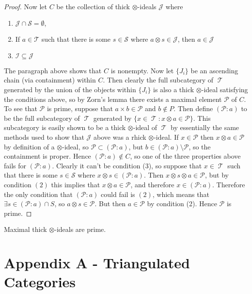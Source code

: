 \documentclass[11pt]{article}
\DeclareMathOperator{\TT}{\mathcal{T}}
\begin{document}
\begin{proof}
Now let $C$ be the collection of thick $\otimes$-ideals $\mathcal{J}$ where 
\begin{enumerate}[(1)]
	\item $\mathcal{J} \cap \mathcal{S} = \emptyset$,
	\item If $a \in \mathcal{T}$ such that there is some $s \in \mathcal{S}$ where $a \otimes s \in \mathcal{J}$, then $a \in \mathcal{J}$
	\item $\mathcal{I} \subseteq \mathcal{J}$
\end{enumerate}
The paragraph above shows that $C$ is nonempty. Now let $\{J_i\}$ be an ascending chain (via containment) within $C$. Then clearly the full subcategory of $\TT$ generated by the union of the objects within $\{J_i\}$ is also a thick $\otimes$-ideal satisfying the conditions above, so by Zorn's lemma there exists a maximal element $\mathcal{P}$ of $C$. To see that $\mathcal{P}$ is prime, suppose that $a \times b \in \mathcal{P}$ and $b \not\in P$. Then define $(\mathcal{P}:a)$ to be the full subcategory of $\TT$ generated by $\{x \in \TT: x \otimes a \in \mathcal{P}\}$. This subcategory is easily shown to be a thick $\otimes$-ideal of $\TT$ by essentially the same methods used to show that $\mathcal{J}$ above was a rhick $\otimes$-ideal. If $x \in \mathcal{P}$ then $x \otimes a \in \mathcal{P}$ by definition of a $\otimes$-ideal, so $\mathcal{P} \subset (\mathcal{P}: a)$, but $b \in (\mathcal{P}: a) \setminus \mathcal{P}$, so the containment is proper. Hence $(\mathcal{P}:a) \not\in C$, so one of the three properties above fails for $(\mathcal{P}:a)$. Clearly it can't be condition (3), so suppose that $x \in \TT$ such that there is some $s \in \mathcal{S}$ where $x \otimes s \in (\mathcal{P}: a)$. Then $x \otimes s \otimes a \in \mathcal{P}$, but by condition $(2)$ this implies that $x \otimes a \in \mathcal{P}$, and therefore $x \in (\mathcal{P}:a)$. Therefore the only condition that $(\mathcal{P}:a)$ could fail is $(2)$, which means that $\exists s \in (\mathcal{P}:a) \cap S$, so $a \otimes s \in \mathcal{P}$. But then $a \in \mathcal{P}$ by condition (2). Hence $\mathcal{P}$ is prime.
\end{proof}

\begin{cor}
Maximal thick $\otimes$-ideals are prime.
\end{cor}


\newpage


\section{Appendix A - Triangulated Categories}
\end{document}

